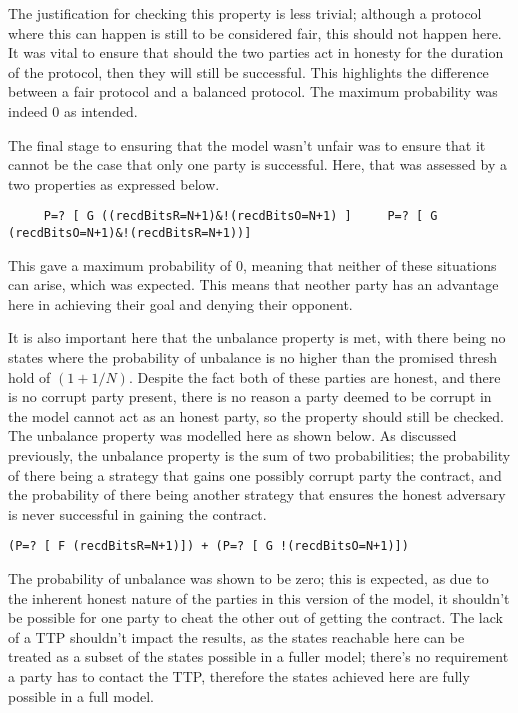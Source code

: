 \documentclass{l4proj}
\begin{document}
The justification for checking this property is less trivial; although a protocol where this can happen is still to be considered fair, this should not happen here. It was vital to ensure that should the two parties act in honesty for the duration of the protocol, then they will still be successful. This highlights the difference between a fair protocol and a balanced protocol. The maximum probability was indeed 0 as intended.

The final stage to ensuring that the model wasn't unfair was to ensure that it cannot be the case that only one party is successful. Here, that was assessed by a two properties as expressed below. 

\begin{lstlisting}
     P=? [ G ((recdBitsR=N+1)&!(recdBitsO=N+1) ]     P=? [ G (recdBitsO=N+1)&!(recdBitsR=N+1))]
\end{lstlisting}

This gave a maximum probability of 0, meaning that neither of these situations can arise, which was expected. This means that neother party has an advantage here in achieving their goal and denying their opponent.


It is also important here that the unbalance property is met, with there being no states where the probability of unbalance is no higher than the promised thresh hold of $(1+1/N)$. Despite the fact both of these parties are honest, and there is no corrupt party present, there is no reason a party deemed to be corrupt in the model cannot act as an honest party, so the property should still be checked. The unbalance property was modelled here as shown below. As discussed previously, the unbalance property is the sum of two probabilities; the probability of there being a strategy that gains one possibly corrupt party the contract, and the probability of there being another strategy that ensures the honest adversary is never successful in gaining the contract. 

\begin{lstlisting}
(P=? [ F (recdBitsR=N+1)]) + (P=? [ G !(recdBitsO=N+1)])
\end{lstlisting}

The probability of unbalance was shown to be zero; this is expected, as due to the inherent honest nature of the parties in this version of the model, it shouldn't be possible for one party to cheat the other out of getting the contract. The lack of a TTP shouldn't impact the results, as the states reachable here can be treated as a subset of the states possible in a fuller model; there's no requirement a party has to contact the TTP, therefore the states achieved here are fully possible in a full model.
\end{document}
